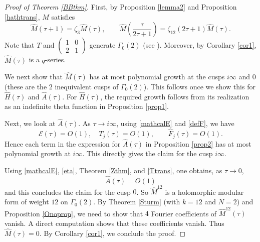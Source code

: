 \documentclass[12pt,reqno]{amsart}
\newcommand{\G}{\Gamma}
\renewcommand{\t}{\tau}
\newcommand{\z}{\zeta}
\renewcommand{\(}{\left\(}
\renewcommand{\)}{\right\)}
\renewcommand{\i}{\infty}
\newcommand{\os}[2]{\overset{#1}{#2}}
\numberwithin{equation}{section}
\theoremstyle{plain}
\theoremstyle{definition}
\numberwithin{equation}{section}
\begin{document}
\begin{proof}[Proof of Theorem \ref{BBthm}]
First, by Proposition \ref{lemma2} and Proposition \ref{hathtrans}, $\widehat{M}$ satisfies
\[
\widehat{M}\left(\t+1\right)=\z_3\widehat{M}(\t),\qquad \widehat{M}\left(\frac{\t}{2\t+1}\right)=\z_{12}(2\t+1)\widehat{M}(\t).
\]
Note that $T$ and $(\begin{smallmatrix}
1&0\\
2&1
\end{smallmatrix})$ generate $\G_0(2)$ (see \cite[Proposition 2]{Chuman}). Moreover, by Corollary \ref{cor1}, $\widehat{M}(\t)$ is a $q$-series. 

We next show that $\widehat{M}(\t)$ has at most polynomial growth at the cusps $i\i$ and $0$ (these are the $2$ inequivalent cusps of $\G_0(2)$). This follows once we show this for $\widehat{H}(\t)$ and $\widehat{A}(\t)$. For $\widehat{H}(\t)$, the required growth follows from its realization as an indefinite theta function in Proposition \ref{prop1}. 

Next, we look at $\widehat{A}(\t)$. As $\t\to i\i$, using \eqref{mathcalE} and \eqref{defF}, we have
\[
\mathcal{E}(\t)=O(1),\quad T_j(\t)=O(1),\qquad \widehat{F}_j(\t)=O(1).
\]
Hence each term in the expression for $\widehat{A}(\t)$ in Proposition \ref{prop2} has at most polynomial growth at $i\infty$. This directly gives the claim for the cusp $i\i$. 

Using \eqref{mathcalE}, \eqref{eta}, Theorem \ref{Zthm}, and \eqref{Ttrans}, one obtains, as $\t\to 0$, 
\[
\widehat{A}\!\left(\t\right)=O(1)\]
and this concludes the claim for the cusp $0$. So $\widehat{M}^{12}$ is a holomorphic modular form of weight $12$ on $\G_0(2)$. By Theorem \ref{Sturm} (with $k=12$ and $N=2$) and Proposition \ref{Onoprop}, we need to show that $4$
Fourier coefficients of $\widehat{M}^{12}(\t)$ vanish. A direct computation shows that these coefficients vanish. Thus $\widehat{M}(\t)=0$. By Corollary \ref{cor1}, we conclude the proof.\qedhere 
\end{proof}




\end{document}
